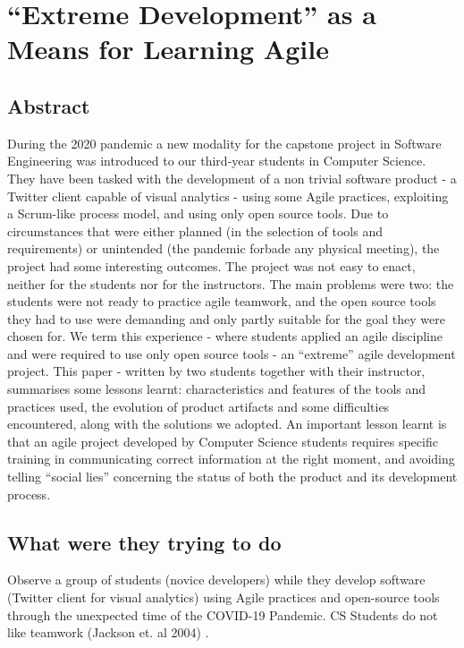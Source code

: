 \section{“Extreme Development” as a Means for Learning Agile}

\subsection{Abstract}

During the 2020 pandemic a new modality for the capstone project in Software Engineering was introduced to our third-year students in Computer Science. They have been tasked with the development of a non trivial software product - a Twitter client capable of visual analytics - using some Agile practices, exploiting a Scrum-like process model, and using only open source tools. Due to circumstances that were either planned (in the selection of tools and requirements) or unintended (the pandemic forbade any physical meeting), the project had some interesting outcomes. The project was not easy to enact, neither for the students nor for the instructors. The main problems were two: the students were not ready to practice agile teamwork, and the open source tools they had to use were demanding and only partly suitable for the goal they were chosen for. We term this experience - where students applied an agile discipline and were required to use only open source tools - an “extreme” agile development project. This paper - written by two students together with their instructor, summarises some lessons learnt: characteristics and features of the tools and practices used, the evolution of product artifacts and some difficulties encountered, along with the solutions we adopted. An important lesson learnt is that an agile project developed by Computer Science students requires specific training in communicating correct information at the right moment, and avoiding telling “social lies” concerning the status of both the product and its development process.

\subsection{What were they trying to do}

Observe a group of students (novice developers) while they develop software (Twitter client for visual analytics) using Agile practices and open-source tools through the unexpected time of the COVID-19 Pandemic. CS Students do not like teamwork (Jackson et. al 2004) \cite{waiteStudentCultureVs2004}.

